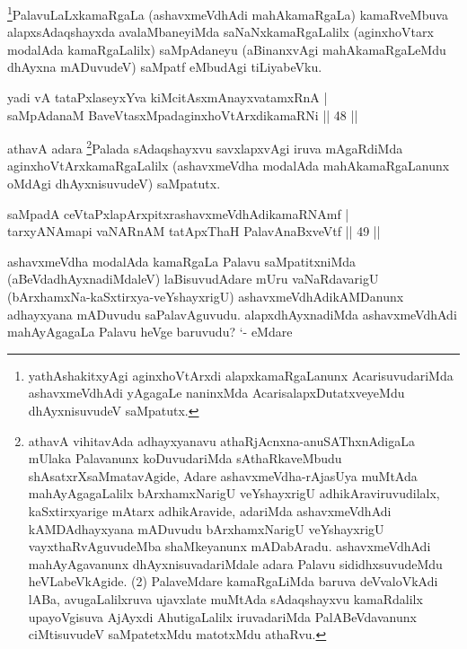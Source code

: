 \begin{artha}
\footnote{yathAshakitxyAgi aginxhoVtArxdi alapxkamaRgaLanunx AcarisuvudariMda ashavxmeVdhAdi yAgagaLe naninxMda AcarisalapxDutatxveyeMdu dhAyxnisuvudeV saMpatutx.}PalavuLaLxkamaRgaLa (ashavxmeVdhAdi mahAkamaRgaLa) kamaRveMbuva alapxsAdaqshayxda avalaMbaneyiMda saNaNxkamaRgaLalilx (aginxhoVtarx modalAda kamaRgaLalilx) saMpAdaneyu (aBinanxvAgi mahAkamaRgaLeMdu dhAyxna mADuvudeV) saMpatf eMbudAgi tiLiyabeVku.
\end{artha}


\begin{shl}
yadi vA tataPxlaseyxYva kiMcitAsxmAnayxvatamxRnA |\\
saMpAdanaM BaveVtasxMpadaginxhoVtArxdikamaRNi \hfill || 48 ||
\end{shl}

\begin{artha}
athavA adara \footnote{athavA vihitavAda adhayxyanavu athaRjAcnxna-anuSAThxnAdigaLa mUlaka Palavanunx koDuvudariMda sAthaRkaveMbudu shAsatxrXsaMmatavAgide, Adare ashavxmeVdha-rAjasUya muMtAda mahAyAgagaLalilx bArxhamxNarigU veYshayxrigU adhikAraviruvudilalx, kaSxtirxyarige mAtarx adhikAravide, adariMda ashavxmeVdhAdi kAMDAdhayxyana mADuvudu bArxhamxNarigU veYshayxrigU vayxthaRvAguvudeMba shaMkeyanunx mADabAradu. ashavxmeVdhAdi mahAyAgavanunx dhAyxnisuvadariMdale adara Palavu sididhxsuvudeMdu heVLabeVkAgide. (2) PalaveMdare kamaRgaLiMda baruva deVvaloVkAdi lABa, avugaLalilxruva ujavxlate muMtAda sAdaqshayxvu kamaRdalilx upayoVgisuva AjAyxdi AhutigaLalilx iruvadariMda PalABeVdavanunx ciMtisuvudeV saMpatetxMdu matotxMdu athaRvu.}Palada sAdaqshayxvu savxlapxvAgi iruva mAgaRdiMda aginxhoVtArxkamaRgaLalilx (ashavxmeVdha modalAda mahAkamaRgaLanunx oMdAgi dhAyxnisuvudeV) saMpatutx.
\end{artha}

\begin{shl}
saMpadA ceVtaPxlapArxpitxrashavxmeVdhAdikamaRNAmf |\\
tarxyANAmapi vaNARnAM tatApxThaH PalavAnaBxveVtf \hfill || 49 ||
\end{shl}

\begin{artha}
ashavxmeVdha modalAda kamaRgaLa Palavu saMpatitxniMda (aBeVdadhAyxnadiMdaleV) laBisuvudAdare mUru vaNaRdavarigU (bArxhamxNa-kaSxtirxya-veYshayxrigU) ashavxmeVdhAdikAMDanunx adhayxyana mADuvudu saPalavAguvudu. alapxdhAyxnadiMda ashavxmeVdhAdi mahAyAgagaLa Palavu heVge baruvudu? `- eMdare \mdash 
\end{artha}

